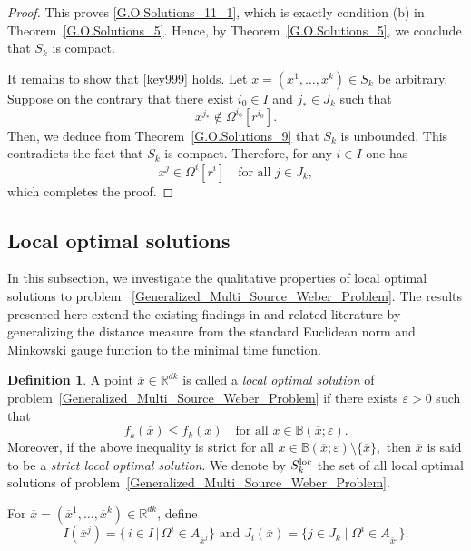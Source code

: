 \documentclass[sn-mathphys-num]{sn-jnl}%
\theoremstyle{definition}
\newtheorem{definition}[theorem]{Definition}
\begin{document}
\begin{proof}
This proves \eqref{G.O.Solutions_11_1}, which is exactly condition \rm{(b)} in Theorem~\ref{G.O.Solutions_5}. Hence, by Theorem~\ref{G.O.Solutions_5}, we conclude that $S_k$ is compact.


It remains to show that \eqref{key999} holds. Let $ x=( x^1,\dots, x^k)\in S_k$ be arbitrary.  Suppose on the contrary that there exist $i_0\in I$ and $j_*\in J_k$ such that
\[
 x^{j_*}\notin \Omega^{i_0}[r^{i_0}].
\]
Then, we deduce from Theorem~\ref{G.O.Solutions_9} that $S_k$ is unbounded. This contradicts the fact that $S_k$ is compact. Therefore, for any $i\in I$ one has
\[
x^j\in \Omega^{i}[r^{i}] \quad \text{for all } j\in J_k,
\]
which completes the proof.
\end{proof}


\subsection{Local optimal solutions}

In this subsection, we investigate the qualitative properties of local optimal solutions to problem ~\eqref{Generalized_Multi_Source_Weber_Problem}. The results presented here extend the existing findings in \cite{cuong2020qualitative,cuong2023global,CTWYOptim,Cuong2024,LNSYkcenter,LNTV} and related literature by generalizing the distance measure from the standard Euclidean norm and Minkowski gauge function to the minimal time function.


\begin{definition}\label{deflocal}
	A point $\overline{x}\in\mathbb{R}^{dk}$ is called a \textit{local optimal solution} of problem~\eqref{Generalized_Multi_Source_Weber_Problem} if there exists $\varepsilon>0$ such that
	\[
	f_k(\overline{x})\leq f_k(x)\quad \text{for all } x\in\mathbb{B}(\overline{x};\varepsilon).
	\]
	Moreover, if the above inequality is strict for all
	\(x\in\mathbb{B}(\overline{x};\varepsilon)\setminus\{\overline{x}\},\)
	then $\overline{x}$ is said to be a \textit{strict local optimal solution}. We denote by $S_k^{{\rm loc}}$ the set of all local optimal solutions of problem~\eqref{Generalized_Multi_Source_Weber_Problem}.
\end{definition}

For $\overline{x}=(\overline{x}^1,\dots,\overline{x}^k)\in \mathbb{R}^{dk}$, define
\begin{equation}
	\label{L.O.Solution_1}
	I(\overline{x}^j)=\big\{\,i\in I \,\big|\, \Omega^i \in A_{\overline{x}^j} \big\} \text{ and } 
	J_i(\overline{x})=\{j\in J_k \mid \Omega^i \in A_{\overline{x}^j}\}.
\end{equation}
\end{document}
